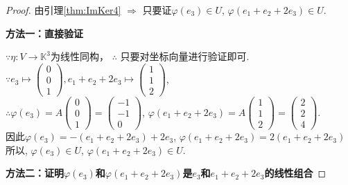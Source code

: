 \begin{proof}
  由引理\ref{thm:ImKer4} $\Longrightarrow$ 只要证$\varphi(e_3) \in U$,
  $\varphi(e_1+e_2+2e_3) \in U$. 

  \textbf{方法一：直接验证}
  
  $\because \eta: V \longrightarrow \mathbb{K}^3$为线性同构，
  $\therefore$ 只要对坐标向量进行验证即可. \\
  $\because e_3 \mapsto
  \begin{pmatrix}
    0\\
    0\\
    1
  \end{pmatrix},e_1+e_2+2e_3 \mapsto
  \begin{pmatrix}
    1\\
    1\\
    2
  \end{pmatrix}$, \\
  $\therefore \varphi(e_3) = A
  \begin{pmatrix}
    0\\
    0\\
    1
  \end{pmatrix} =
  \begin{pmatrix}
    -1\\
    -1\\
    0
  \end{pmatrix}$, 
  $\varphi(e_1+e_2+2e_3) = A
  \begin{pmatrix}
    1\\
    1\\
    2
  \end{pmatrix} =
  \begin{pmatrix}
    2\\
    2\\
    4
  \end{pmatrix}$. \\
  因此$\varphi(e_3) = -(e_1+e_2+2e_3) + 2e_3$, 
  $\varphi(e_1+e_2+2e_3) = 2(e_1+e_2+2e_3)$\\
  所以, $\varphi(e_3) \in U$, $\varphi(e_1+e_2+2e_3) \in U$.

  \textbf{方法二：证明$\varphi(e_3)$和$\varphi(e_1+e_2+2e_3)$是$e_3$和$e_1+e_2+2e_3$的线性组合}


\end{proof}
